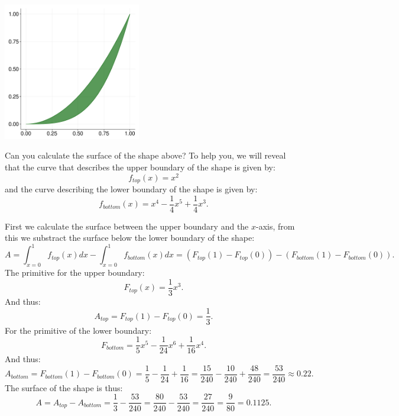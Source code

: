 \documentclass[a4paper]{report}
\begin{document}
\begin{Exercise}[title=A different shape, difficulty=3,label=ex1202]
\begin{center}
\includegraphics[width=0.45\textwidth,page=1]{ex_int2.pdf}
\end{center}
Can you calculate the surface of the shape above? To help you, we will reveal that the curve that describes the upper boundary of the shape is given by:
\begin{equation*}
f_{top}(x) = x^2
\end{equation*}
and the curve describing the lower boundary of the shape is given by:
\begin{equation*}
f_{bottom}(x) = x^4-\frac{1}{4}x^5+\frac{1}{4}x^3.
\end{equation*}

\end{Exercise}

\begin{Answer}[ref=ex1202]
\noindent First we calculate the surface between the upper boundary and the $x$-axis, from this we substract the surface below the lower boundary of the shape:
\begin{equation*}
A = \int_{x=0}^1 f_{top}(x) dx - \int_{x=0}^1 f_{bottom}(x) dx = (F_{top}(1)-F_{top}(0))-(F_{bottom}(1)-F_{bottom}(0)). 
\end{equation*}
The primitive for the upper boundary:
\begin{equation*}
F_{top}(x) = \frac{1}{3}x^3.
\end{equation*}
And thus:
\begin{equation*}
A_{top} = F_{top}(1) - F_{top}(0) = \frac{1}{3}.
\end{equation*}
For the primitive of the lower boundary:
\begin{equation*}
F_{bottom} = \frac{1}{5}x^5 - \frac{1}{24}x^6 + \frac{1}{16}x^4.
\end{equation*}
And thus:
\begin{equation*}
A_{bottom} = F_{bottom}(1) - F_{bottom}(0) = \frac{1}{5} - \frac{1}{24} + \frac{1}{16} = \frac{15}{240} - \frac{10}{240} + \frac{48}{240} = \frac{53}{240} \approx 0.22.
\end{equation*}
The surface of the shape is thus:
\begin{equation*}
A = A_{top} - A_{bottom} = \frac{1}{3} - \frac{53}{240} = \frac{80}{240} - \frac{53}{240} = \frac{27}{240} = \frac{9}{80} = 0.1125.
\end{equation*}

\end{Answer}
\end{document}
